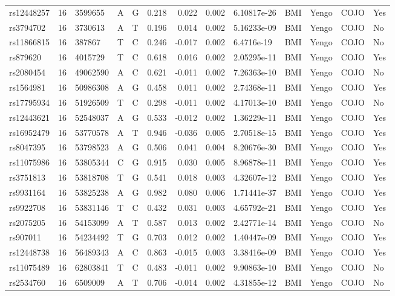 \documentclass[11pt,twoside]{bristolthesis}
\begin{document}
\begin{longtable}[t]{lrlllrrrlllll}
rs12448257 & 16 & 3599655 & A & G & 0.218 & 0.022 & 0.002 & 6.10817e-26 & BMI & Yengo & COJO & Yes\\
rs3794702 & 16 & 3730613 & A & T & 0.196 & 0.014 & 0.002 & 5.16233e-09 & BMI & Yengo & COJO & No\\
rs11866815 & 16 & 387867 & T & C & 0.246 & -0.017 & 0.002 & 6.4716e-19 & BMI & Yengo & COJO & No\\
rs879620 & 16 & 4015729 & T & C & 0.618 & 0.016 & 0.002 & 2.05295e-11 & BMI & Yengo & COJO & Yes\\
\addlinespace
rs2080454 & 16 & 49062590 & A & C & 0.621 & -0.011 & 0.002 & 7.26363e-10 & BMI & Yengo & COJO & No\\
rs1564981 & 16 & 50986308 & A & G & 0.458 & 0.011 & 0.002 & 2.74368e-11 & BMI & Yengo & COJO & Yes\\
rs17795934 & 16 & 51926509 & T & C & 0.298 & -0.011 & 0.002 & 4.17013e-10 & BMI & Yengo & COJO & No\\
rs12443621 & 16 & 52548037 & A & G & 0.533 & -0.012 & 0.002 & 1.36229e-11 & BMI & Yengo & COJO & Yes\\
rs16952479 & 16 & 53770578 & A & T & 0.946 & -0.036 & 0.005 & 2.70518e-15 & BMI & Yengo & COJO & Yes\\
\addlinespace
rs8047395 & 16 & 53798523 & A & G & 0.506 & 0.041 & 0.004 & 8.20676e-30 & BMI & Yengo & COJO & Yes\\
rs11075986 & 16 & 53805344 & C & G & 0.915 & 0.030 & 0.005 & 8.96878e-11 & BMI & Yengo & COJO & Yes\\
rs3751813 & 16 & 53818708 & T & G & 0.541 & 0.018 & 0.003 & 4.32607e-12 & BMI & Yengo & COJO & Yes\\
rs9931164 & 16 & 53825238 & A & G & 0.982 & 0.080 & 0.006 & 1.71441e-37 & BMI & Yengo & COJO & Yes\\
rs9922708 & 16 & 53831146 & T & C & 0.432 & 0.031 & 0.003 & 4.65792e-21 & BMI & Yengo & COJO & Yes\\
\addlinespace
rs2075205 & 16 & 54153099 & A & T & 0.587 & 0.013 & 0.002 & 2.42771e-14 & BMI & Yengo & COJO & No\\
rs907011 & 16 & 54234492 & T & G & 0.703 & 0.012 & 0.002 & 1.40447e-09 & BMI & Yengo & COJO & Yes\\
rs12448738 & 16 & 56489343 & A & C & 0.863 & -0.015 & 0.003 & 3.38416e-09 & BMI & Yengo & COJO & Yes\\
rs11075489 & 16 & 62803841 & T & C & 0.483 & -0.011 & 0.002 & 9.90863e-10 & BMI & Yengo & COJO & No\\
rs2534760 & 16 & 6509009 & A & T & 0.706 & -0.014 & 0.002 & 4.31855e-12 & BMI & Yengo & COJO & No\\

\end{longtable}
\end{document}
